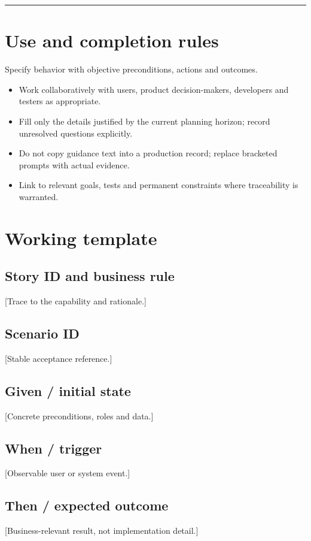 \documentclass[11pt,letterpaper]{article}
\begin{document}
\tableofcontents\medskip\noindent\rule{\linewidth}{0.4pt}\medskip
\section{Use and completion rules}
Specify behavior with objective preconditions, actions and outcomes.

\begin{itemize}[leftmargin=*,itemsep=2pt]
\item Work collaboratively with users, product decision-makers, developers and testers as appropriate.
\item Fill only the details justified by the current planning horizon; record unresolved questions explicitly.
\item Do not copy guidance text into a production record; replace bracketed prompts with actual evidence.
\item Link to relevant goals, tests and permanent constraints where traceability is warranted.
\end{itemize}
\section{Working template}
\subsection{Story ID and business rule}
[Trace to the capability and rationale.]

\subsection{Scenario ID}
[Stable acceptance reference.]

\subsection{Given / initial state}
[Concrete preconditions, roles and data.]

\subsection{When / trigger}
[Observable user or system event.]

\subsection{Then / expected outcome}
[Business-relevant result, not implementation detail.]
\end{document}
